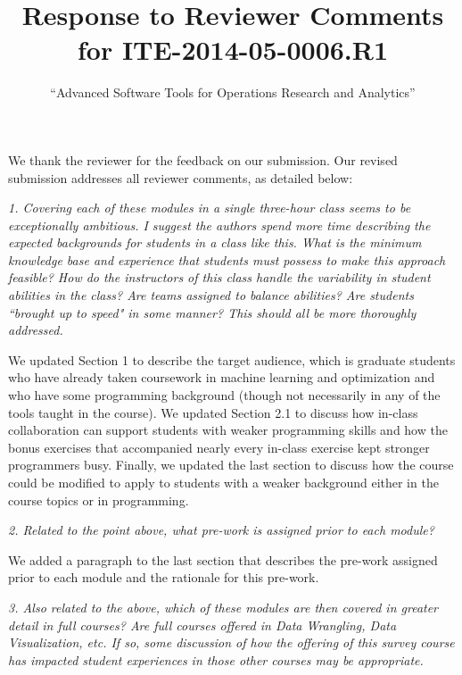 \documentclass[12pt, letterpaper]{article}
\title{Response to Reviewer Comments for ITE-2014-05-0006.R1}
\author{``Advanced Software Tools for Operations Research and Analytics''}
\date{}
\begin{document}
\maketitle

We thank the reviewer for the feedback on our submission. Our revised submission addresses all reviewer comments, as detailed below:

\vspace{0.5cm}

\noindent\textit{1. Covering each of these modules in a single three-hour class seems to be exceptionally ambitious. I suggest the authors spend more time describing the expected backgrounds for students in a class like this. What is the minimum knowledge base and experience that students must possess to make this approach feasible? How do the instructors of this class handle the variability in student abilities in the class? Are teams assigned to balance abilities? Are students ``brought up to speed" in some manner? This should all be more thoroughly addressed.}

We updated Section 1 to describe the target audience, which is graduate students who have already taken coursework in machine learning and optimization and who have some programming background (though not necessarily in any of the tools taught in the course). We updated Section 2.1 to discuss how in-class collaboration can support students with weaker programming skills and how the bonus exercises that accompanied nearly every in-class exercise kept stronger programmers busy. Finally, we updated the last section to discuss how the course could be modified to apply to students with a weaker background either in the course topics or in programming. 

\vspace{0.5cm}

\noindent\textit{2. Related to the point above, what pre-work is assigned prior to each module?}

We added a paragraph to the last section that describes the pre-work assigned prior to each module and the rationale for this pre-work.

\vspace{0.5cm}

\noindent\textit{3. Also related to the above, which of these modules are then covered in greater detail in full courses? Are full courses offered in Data Wrangling, Data Visualization, etc. If so, some discussion of how the offering of this survey course has impacted student experiences in those other courses may be appropriate.}
\end{document}
